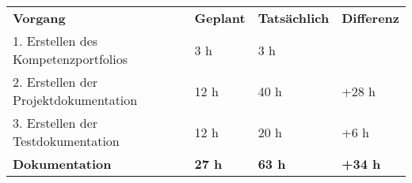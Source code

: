 \begin{tabular}{llll}
\rowcolor{heading}\textbf{Vorgang} & \textbf{Geplant} & \textbf{Tatsächlich} & \textbf{Differenz} \\
1. Erstellen des Kompetenzportfolios & 3 h   & 3 h   &  \\
\rowcolor{odd}2. Erstellen der Projektdokumentation & 12 h   & 40 h   & +28 h \\
3. Erstellen der Testdokumentation & 12 h   & 20 h  &  +6 h \\
\hline
\hline
\rowcolor{heading}\textbf{Dokumentation} & \textbf{27 h} & \textbf{63 h} & \textbf{+34 h} \\
\end{tabular}
